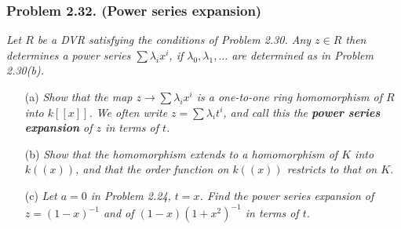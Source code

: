 \documentclass{article}
\begin{document}



\subsubsection*{Problem 2.32. (Power series expansion)}
\emph{Let $R$ be a DVR satisfying the conditions of Problem 2.30.
Any $z \in R$ then determines a power series $\sum \lambda_i x^i$,
if $\lambda_0, \lambda_1, \ldots$ are determined as in Problem 2.30(b).}
\begin{enumerate}
\item[(a)]
  \emph{Show that the map $z \to \sum \lambda_i x^i$
  is a one-to-one ring homomorphism of $R$ into $k[[x]]$.
  We often write $z = \sum \lambda_i t^i$,
  and call this the \textbf{power series expansion} of $z$ in terms of $t$.}

\item[(b)]
  \emph{Show that the homomorphism extends to a homomorphism of $K$ into $k((x))$,
  and that the order function on $k((x))$ restricts to that on $K$.}

\item[(c)]
  \emph{Let $a = 0$ in Problem 2.24, $t = x$.
  Find the power series expansion of $z = (1-x)^{-1}$ and of
  $(1-x)(1+x^2)^{-1}$ in terms of $t$.} \\
\end{enumerate}
\end{document}
